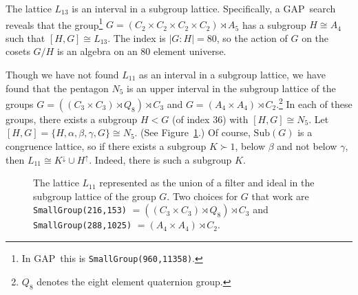 \documentclass[cm,dissertation]{uhthesis}
\theoremstyle{plain}
\theoremstyle{definition}
\theoremstyle{remark}
\numberwithin{theorem}{section}
\numberwithin{claim}{chapter}
\numberwithin{equation}{section}
\numberwithin{conjecture}{chapter}
\newcommand{\<}{\ensuremath{\langle}}
\renewcommand{\>}{\ensuremath{\rangle}}
\newcommand{\Sub}{\ensuremath{\mathrm{Sub}}}
\newcommand{\GAP}{\textsf{GAP}}
\newcommand{\0}{\ensuremath{\mathbf{0}}}
\newcommand{\1}{\ensuremath{\mathbf{1}}}
\newcommand{\2}{\ensuremath{\mathbf{2}}}
\newcommand{\3}{\ensuremath{\mathbf{3}}}
\newcommand{\4}{\ensuremath{\mathbf{4}}}
\newcommand{\5}{\ensuremath{\mathbf{5}}}
\begin{document}
The lattice  $L_{13}$ is an interval in a subgroup lattice.  Specifically, 
a \GAP\ search reveals that the group\footnote{In \GAP\ this is {\tt SmallGroup(960,11358)}.}
$G = (C_2 \times C_2 \times C_2 \times C_2) \rtimes A_5$
has a subgroup $H\cong A_4$ such that $[H,G]\cong L_{13}$.
The index is $|G:H|=80$, so the action of $G$ on the cosets $G/H$ is an
algebra on an 80 element universe.

Though we have not found $L_{11}$ as an interval in a subgroup lattice, we
have found that the pentagon $N_5$ is an upper interval 
in the subgroup lattice of the groups
$G = ((C_3 \times C_3) \rtimes Q_8) \rtimes C_3$ and
$G=(A_4 \times A_4) \rtimes C_2$.\footnote{$Q_8$ denotes the eight element quaternion group.}
In each of these groups, there exists a subgroup $H < G$ (of index 36) with
$[H, G] \cong N_5$.  
Let $[H, G] = \{H, \alpha, \beta, \gamma, G\} \cong N_5$.  (See Figure~\ref{fig:L11}.)
Of course, $\Sub(G)$ is a congruence lattice, so
if there exists a subgroup $K \succ 1$, below $\beta$ and not below $\gamma$, 
then $L_{11} \cong K^\downarrow \cup H^\uparrow$.  Indeed, there is such a
subgroup $K$.
 
\begin{figure}
\begin{center}
  {
}
\end{center}
  \caption{The lattice $L_{11}$ represented as the union of a filter and ideal in the
subgroup lattice of the group  $G$.  Two choices for $G$ that work are
{\tt SmallGroup(216,153)} $=((C_3 \times C_3) \rtimes Q_8) \rtimes C_3$ and
{\tt SmallGroup(288,1025)} $=(A_4 \times A_4) \rtimes C_2$. }
  \label{fig:L11}
\end{figure}
\end{document}
